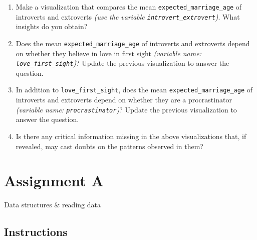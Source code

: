 \documentclass[
  letterpaper,
  DIV=11,
  numbers=noendperiod]{scrreprt}
\begin{document}
\begin{enumerate}
\def\labelenumi{\arabic{enumi}.}
\item
  Make a visualization that compares the mean
  \texttt{expected\_marriage\_age} of introverts and extroverts
  \emph{(use the variable \texttt{introvert\_extrovert})}. What insights
  do you obtain?
\item
  Does the mean \texttt{expected\_marriage\_age} of introverts and
  extroverts depend on whether they believe in love in first sight
  \emph{(variable name: \texttt{love\_first\_sight})}? Update the
  previous visualization to answer the question.
\item
  In addition to \texttt{love\_first\_sight}, does the mean
  \texttt{expected\_marriage\_age} of introverts and extroverts depend
  on whether they are a procrastinator \emph{(variable name:
  \texttt{procrastinator})}? Update the previous visualization to answer
  the question.
\item
  Is there any critical information missing in the above visualizations
  that, if revealed, may cast doubts on the patterns observed in them?
\end{enumerate}

\cleardoublepage
{}
{}
\appendix

\hypertarget{assignment-a}{%
\chapter{Assignment A}\label{assignment-a}}

Data structures \& reading data

\hfill\break

\hypertarget{instructions-2}{%
\section*{Instructions}\label{instructions-2}}

\end{document}
